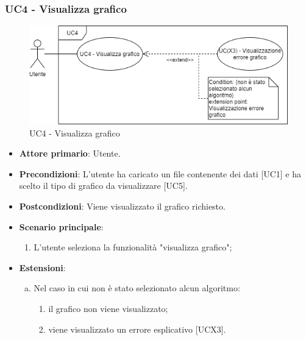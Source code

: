 \subsubsection{UC4 - Visualizza grafico}
\begin{figure}[h]
\includegraphics[width=\linewidth]{section/Images/UC4VisualizzaGrafico.png}
\centering
\caption{UC4 - Visualizza grafico}
\end{figure}
\begin{itemize}
	\item \textbf{Attore primario}: Utente.
	\item \textbf{Precondizioni}: L'utente ha caricato un file contenente dei dati [UC1] e ha scelto il tipo di grafico da visualizzare [UC5].
	\item \textbf{Postcondizioni}: Viene visualizzato il grafico richiesto.
	\item \textbf{Scenario principale}:
		\begin{enumerate}
			\item L'utente seleziona la funzionalità "visualizza grafico";
		\end{enumerate}
	\item \textbf{Estensioni}:
	\begin{enumerate}[(a)]
		\item Nel caso in cui non è stato selezionato alcun algoritmo:
		\begin{enumerate}[1.]
			\item il grafico non viene visualizzato;
			\item viene visualizzato un errore esplicativo [UCX3].
		\end{enumerate}
	\end{enumerate}
\end{itemize}